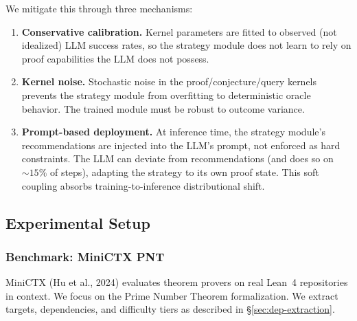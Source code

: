 We mitigate this through three mechanisms:
\begin{enumerate}
    \item \textbf{Conservative calibration.} Kernel parameters are fitted to observed (not idealized) LLM success rates, so the strategy module does not learn to rely on proof capabilities the LLM does not possess.
    \item \textbf{Kernel noise.} Stochastic noise in the proof/conjecture/query kernels prevents the strategy module from overfitting to deterministic oracle behavior. The trained module must be robust to outcome variance.
    \item \textbf{Prompt-based deployment.} At inference time, the strategy module's recommendations are injected into the LLM's prompt, not enforced as hard constraints. The LLM can deviate from recommendations (and does so on $\sim\!15\%$ of steps), adapting the strategy to its own proof state. This soft coupling absorbs training-to-inference distributional shift.
\end{enumerate}


\subsection{Experimental Setup}\label{sec:exp-setup}

\subsubsection{Benchmark: MiniCTX PNT}\label{sec:minictx}

MiniCTX (Hu et al., 2024) evaluates theorem provers on real Lean~4 repositories in context. We focus on the Prime Number Theorem formalization. We extract targets, dependencies, and difficulty tiers as described in \S\ref{sec:dep-extraction}.

